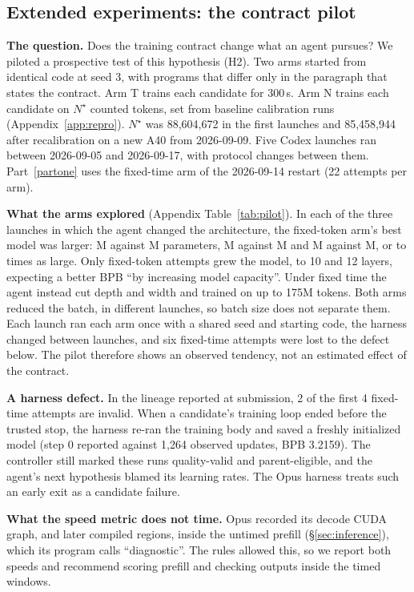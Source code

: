 \documentclass{article}
\newif\ifshowhumanmarkers \showhumanmarkersfalse
\newcommand{\humantag}[1]{{\color{humanframe}\sffamily\scriptsize\bfseries HUMAN AUTHOR MUST REWRITE/VERIFY [#1]}\ }
\newcommand{\humanauthor}[2][]{\ifshowhumanmarkers\begin{humanbox}\humantag{#1}#2\end{humanbox}\else #2\par\fi}
\begin{document}
\subsection{Extended experiments: the contract pilot}\label{sec:pilot}
\humanauthor[P2-15 r6]{\textbf{The question.} Does the training contract change what an agent pursues? We piloted a prospective test of this hypothesis (H2). Two arms started from identical code at seed 3, with programs that differ only in the paragraph that states the contract. Arm T trains each candidate for 300\,s. Arm N trains each candidate on $N^\star$ counted tokens, set from baseline calibration runs (Appendix~\ref{app:repro}). $N^\star$ was 88,604,672 in the first launches and 85,458,944 after recalibration on a new A40 from 2026-09-09. Five Codex launches ran between 2026-09-05 and 2026-09-17, with protocol changes between them. Part~\ref{partone} uses the fixed-time arm of the 2026-09-14 restart (22 attempts per arm).

\textbf{What the arms explored} (Appendix Table~\ref{tab:pilot}). In each of the three launches in which the agent changed the architecture, the fixed-token arm's best model was larger: \CRFivePilotNA M against \CRFivePilotTA M parameters, \CRFivePilotNB M against \CRFivePilotTB M and \CRFivePilotNC M against \CRFivePilotTC M, or \CRFivePilotRatioLo{} to \CRFivePilotRatioHi{} times as large. Only fixed-token attempts grew the model, to 10 and 12 layers, expecting a better BPB ``by increasing model capacity''. Under fixed time the agent instead cut depth and width and trained on up to 175M tokens. Both arms reduced the batch, in different launches, so batch size does not separate them. Each launch ran each arm once with a shared seed and starting code, the harness changed between launches, and six fixed-time attempts were lost to the defect below. The pilot therefore shows an observed tendency, not an estimated effect of the contract.

\textbf{A harness defect.} In the lineage reported at submission, 2 of the first 4 fixed-time attempts are invalid. When a candidate's training loop ended before the trusted stop, the harness re-ran the training body and saved a freshly initialized model (step 0 reported against 1,264 observed updates, BPB 3.2159). The controller still marked these runs quality-valid and parent-eligible, and the agent's next hypothesis blamed its learning rates. The Opus harness treats such an early exit as a candidate failure.}

\humanauthor[P2-16 r6]{\textbf{What the speed metric does not time.} Opus recorded its decode CUDA graph, and later compiled regions, inside the untimed prefill (\S\ref{sec:inference}), which its program calls ``diagnostic''. The rules allowed this, so we report both speeds and recommend scoring prefill and checking outputs inside the timed windows.}
\label{parttwoend}
\end{document}
